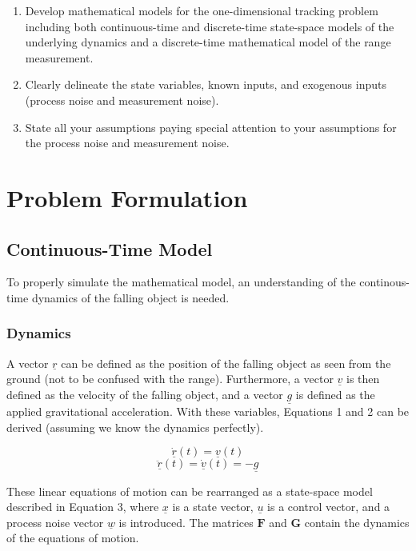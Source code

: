 \documentclass{article}
\begin{document}
\begin{enumerate}
    \item Develop mathematical models for the one-dimensional tracking problem including both continuous-time and discrete-time state-space models of the underlying dynamics and a discrete-time mathematical model of the range measurement.
    \item Clearly delineate the state variables, known inputs, and exogenous inputs (process noise and measurement noise).
    \item State all your assumptions paying special attention to your assumptions for the process noise and measurement noise.
\end{enumerate}

\section{Problem Formulation}

\subsection{Continuous-Time Model}
To properly simulate the mathematical model, an understanding of the continous-time dynamics of the falling object is needed.

\subsubsection{Dynamics}
A vector $\underline{r}$ can be defined as the position of the falling object as seen from the ground (not to be confused with the range). Furthermore, a vector $\underline{v}$ is then defined as the velocity of the falling object, and a vector $\underline{g}$ is defined as the applied gravitational acceleration. With these variables, Equations 1 and 2 can be derived (assuming we know the dynamics perfectly).

\begin{equation}
    \underline{\dot{r}}(t) = \underline{v}(t)
\end{equation}
\begin{equation}
    \underline{\ddot{r}}(t) = \underline{\dot{v}}(t) = -\underline{g}
\end{equation}

 These linear equations of motion can be rearranged as a state-space model described in Equation 3, where $\underline{x}$ is a state vector, $\underline{u}$ is a control vector, and a process noise vector $\underline{w}$ is introduced. The matrices $\mathbf{F}$ and $\mathbf{G}$ contain the dynamics of the equations of motion.
\end{document}
